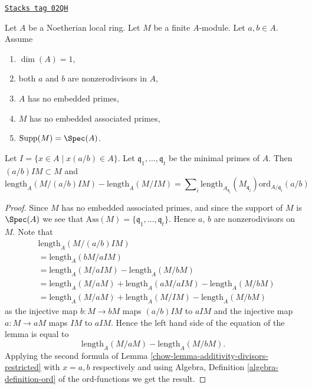 \begin{lemma}
\label{chow-lemma-no-embedded-points-modules}
\href{https://stacks.math.columbia.edu/tag/02QH}{\texttt{Stacks tag 02QH}}

Let $A$ be a Noetherian local ring.
Let $M$ be a finite $A$-module.
Let $a, b \in A$.
Assume
\begin{enumerate}
\item $\dim(A) = 1$,
\item both $a$ and $b$ are nonzerodivisors in $A$,
\item $A$ has no embedded primes,
\item $M$ has no embedded associated primes,
\item $\text{Supp}(M) = \Spec(A)$.
\end{enumerate}
Let $I = \{x \in A \mid x(a/b) \in A\}$.
Let $\mathfrak q_1, \ldots, \mathfrak q_t$ be the minimal
primes of $A$. Then $(a/b)IM \subset M$ and
$$
\text{length}_A(M/(a/b)IM)
-
\text{length}_A(M/IM)
=
\sum\nolimits_i
\text{length}_{A_{\mathfrak q_i}}(M_{\mathfrak q_i})
\text{ord}_{A/\mathfrak q_i}(a/b)
$$
\end{lemma}

\begin{proof}

Since $M$ has no embedded associated primes, and since
the support of $M$ is $\Spec(A)$ we see that
$\text{Ass}(M) = \{\mathfrak q_1, \ldots, \mathfrak q_t\}$.
Hence $a$, $b$ are nonzerodivisors on $M$. Note that
\begin{align*}
& \text{length}_A(M/(a/b)IM) \\
& = \text{length}_A(bM/aIM) \\
& = \text{length}_A(M/aIM)
-
\text{length}_A(M/bM) \\
& = \text{length}_A(M/aM) + \text{length}_A(aM/aIM) - \text{length}_A(M/bM) \\
& = \text{length}_A(M/aM) + \text{length}_A(M/IM) - \text{length}_A(M/bM)
\end{align*}
as the injective map $b : M \to bM$ maps $(a/b)IM$ to $aIM$
and the injective map $a : M \to aM$ maps $IM$ to $aIM$.
Hence the left hand side of the equation of the lemma is
equal to
$$
\text{length}_A(M/aM) - \text{length}_A(M/bM).
$$
Applying the second formula of
Lemma \ref{chow-lemma-additivity-divisors-restricted}
with $x = a, b$ respectively
and using Algebra, Definition \ref{algebra-definition-ord}
of the $\text{ord}$-functions we get the result.
\end{proof}

